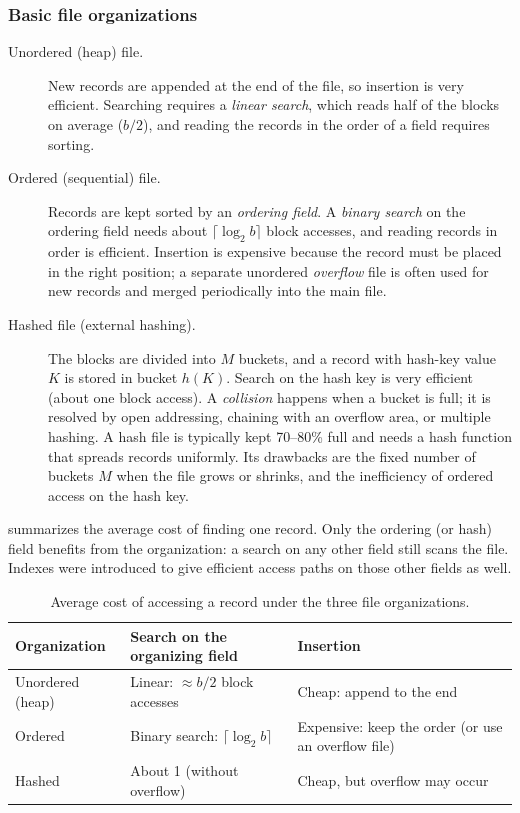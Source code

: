 \subsubsection{Basic file organizations}
\label{sec:file-org}
\begin{description}
  \item[Unordered (heap) file.] New records are appended at the end of the file, so insertion is
        very efficient. Searching requires a \emph{linear search}, which reads half of the blocks
        on average ($b/2$), and reading the records in the order of a field requires sorting.
  \item[Ordered (sequential) file.] Records are kept sorted by an \emph{ordering field}. A
        \emph{binary search} on the ordering field needs about $\lceil\log_2 b\rceil$ block
        accesses, and reading records in order is efficient. Insertion is expensive because the
        record must be placed in the right position; a separate unordered \emph{overflow} file is
        often used for new records and merged periodically into the main file.
  \item[Hashed file (external hashing).] The blocks are divided into $M$ buckets, and a record
        with hash-key value $K$ is stored in bucket $h(K)$. Search on the hash key is very
        efficient (about one block access). A \emph{collision} happens when a bucket is full;
        it is resolved by open addressing, chaining with an overflow area, or multiple hashing.
        A hash file is typically kept 70--80\% full and needs a hash function that spreads
        records uniformly. Its drawbacks are the fixed number of buckets $M$ when the file grows
        or shrinks, and the inefficiency of ordered access on the hash key.
\end{description}
 summarizes the average cost of finding one record. Only the ordering
(or hash) field benefits from the organization: a search on any other field still scans the file.
Indexes were introduced to give efficient access paths on those other fields as well.

\begin{table}[H]
\centering
\small
\begin{tabularx}{\textwidth}{@{}l>{\raggedright\arraybackslash}X>{\raggedright\arraybackslash}X@{}}
\toprule
\textbf{Organization} & \textbf{Search on the organizing field} & \textbf{Insertion} \\
\midrule
Unordered (heap) & Linear: $\approx b/2$ block accesses & Cheap: append to the end \\
Ordered & Binary search: $\lceil\log_2 b\rceil$ & Expensive: keep the order (or use an overflow file) \\
Hashed & About 1 (without overflow) & Cheap, but overflow may occur \\
\bottomrule
\end{tabularx}
\caption{Average cost of accessing a record under the three file organizations.}
\label{tab:file-org}
\end{table}

